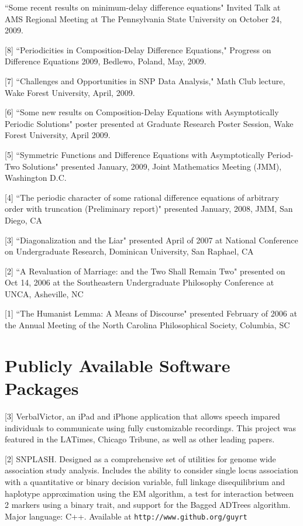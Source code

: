 \documentclass[overlapped,line,letterpaper]{res}
\begin{document}
\begin{resume}
[9] ``Some recent results on minimum-delay difference equations" Invited Talk at AMS Regional Meeting at The Pennsylvania State University on October 24, 2009.

[8] ``Periodicities in Composition-Delay Difference Equations," Progress on Difference Equations 2009, Bedlewo, Poland, May, 2009.

[7] ``Challenges and Opportunities in SNP Data Analysis," Math Club lecture, Wake Forest University, April, 2009. 

[6] ``Some new results on Composition-Delay Equations with Asymptotically Periodic Solutions" poster presented at Graduate Research Poster Session, Wake Forest University, April 2009.

[5] ``Symmetric Functions and Difference Equations with Asymptotically Period-Two Solutions" presented January, 2009, Joint Mathematics Meeting (JMM), Washington D.C.

[4] ``The periodic character of some rational difference equations of arbitrary order with truncation (Preliminary report)" presented January, 2008, JMM, San Diego, CA

[3] ``Diagonalization and the Liar" presented April of 2007 at National Conference on Undergraduate Research, Dominican University, San Raphael, CA

[2] ``A Revaluation of Marriage: and the Two Shall Remain Two" presented on Oct 14, 2006 at the Southeastern Undergraduate Philosophy Conference at UNCA, Asheville, NC

[1] ``The Humanist Lemma: A Means of Discourse" presented February of 2006 at the Annual Meeting of the North Carolina Philosophical Society, Columbia, SC


\section{\bf Publicly Available Software Packages}

[3] VerbalVictor, an iPad and iPhone application that allows speech impared individuals to communicate using fully customizable recordings.  This project was featured in the LATimes, Chicago Tribune, as well as other leading papers.

[2] SNPLASH.  Designed as a comprehensive set of utilities for genome wide association study analysis.  Includes the ability to consider single locus association with a quantitative or binary decision variable, full linkage disequilibrium and haplotype approximation using the EM algorithm, a test for interaction between 2 markers using a binary trait, and support for the Bagged ADTrees algorithm.  Major language: C++. Available at \tt{http://www.github.org/guyrt} 


\end{resume}
\end{document}
